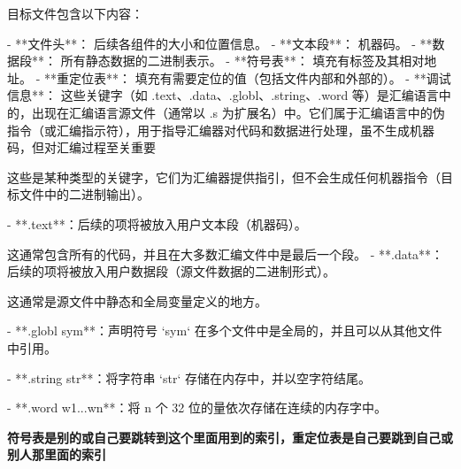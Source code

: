 \documentclass{ctexart}
\begin{document}
目标文件包含以下内容：\par
- **文件头**：
    后续各组件的大小和位置信息。
- **文本段**：
    机器码。
- **数据段**：
    所有静态数据的二进制表示。
- **符号表**：
    填充有标签及其相对地址。
- **重定位表**：
    填充有需要定位的值（包括文件内部和外部的）。
- **调试信息**：
这些关键字（如 .text、.data、.globl、.string、.word 等）是汇编语言中的，出现在汇编语言源文件（通常以 .s 为扩展名）中。它们属于汇编语言中的伪指令（或汇编指示符），用于指导汇编器对代码和数据进行处理，虽不生成机器码，但对汇编过程至关重要\par
这些是某种类型的关键字，它们为汇编器提供指引，但不会生成任何机器指令（目标文件中的二进制输出）。\par
- **.text**：后续的项将被放入用户文本段（机器码）。\par
    这通常包含所有的代码，并且在大多数汇编文件中是最后一个段。
- **.data**：后续的项将被放入用户数据段（源文件数据的二进制形式）。\par
    这通常是源文件中静态和全局变量定义的地方。\par
- **.globl sym**：声明符号 `sym` 在多个文件中是全局的，并且可以从其他文件中引用。\par
- **.string str**：将字符串 `str` 存储在内存中，并以空字符结尾。\par
- **.word w1...wn**：将 n 个 32 位的量依次存储在连续的内存字中。\par

\textbf{符号表是别的或自己要跳转到这个里面用到的索引，重定位表是自己要跳到自己或别人那里面的索引}
\end{document}
